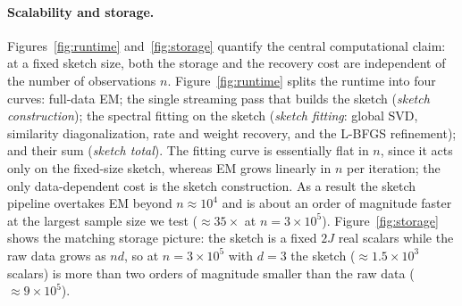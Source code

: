 \documentclass[sigconf,natbib=true,anonymous=true,review=true]{acmart}
\newcommand{\todo}[1]{\textcolor{red}{[TODO: #1]}}
\begin{document}

\paragraph{Scalability and storage.}
Figures~\ref{fig:runtime} and~\ref{fig:storage} quantify the central computational
claim: at a fixed sketch size, both the storage and the recovery cost are independent of
the number of observations $n$. Figure~\ref{fig:runtime} splits the runtime into four
curves: full-data EM; the single streaming pass that builds the sketch (\emph{sketch
construction}); the spectral fitting on the sketch (\emph{sketch fitting}: global SVD,
similarity diagonalization, rate and weight recovery, and the L-BFGS refinement); and
their sum (\emph{sketch total}). The fitting curve is essentially flat in $n$, since it
acts only on the fixed-size sketch, whereas EM grows linearly in $n$ per iteration; the
only data-dependent cost is the sketch construction. As a result the sketch pipeline
overtakes EM beyond $n\approx10^4$ and is about an order of magnitude faster at the
largest sample size we test ($\approx 35\times$ at $n=3\times10^5$).
Figure~\ref{fig:storage} shows the matching storage picture: the sketch is a fixed $2J$
real scalars while the raw data grows as $nd$, so at $n=3\times10^5$ with $d=3$ the
sketch ($\approx\!1.5\times10^3$ scalars) is more than two orders of magnitude smaller
than the raw data ($\approx\!9\times10^5$).
\end{document}
